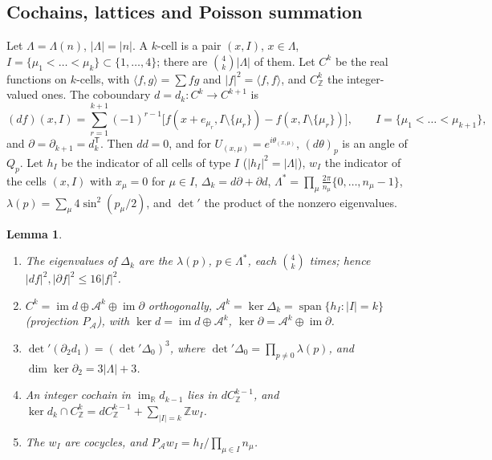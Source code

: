 \documentclass[11pt,a4paper]{amsart}
\newtheorem{lemma}[theorem]{Lemma}
\theoremstyle{definition}
\theoremstyle{remark}
\numberwithin{equation}{section}
\newcommand{\R}{\mathbb{R}}          %
\newcommand{\Z}{\mathbb{Z}}          %
\newcommand{\ip}[2]{\langle #1,#2\rangle}  %
\newcommand{\abs}[1]{\lvert #1\rvert}      %
\begin{document}
\subsection{Cochains, lattices and Poisson summation}

Let $\Lambda=\Lambda(n)$, $|\Lambda|=|n|$. A $k$-cell is a pair $(x,I)$, $x\in\Lambda$, $I=\{\mu_1<\dots<\mu_k\}\subset\{1,\dots,4\}$; there are $\binom4k|\Lambda|$ of them. Let $C^k$ be the real functions on $k$-cells, with $\ip fg=\sum fg$ and $\abs f^2=\ip ff$, and $C^k_\Z$ the integer-valued ones. The coboundary $d=d_k\colon C^k\to C^{k+1}$ is
\begin{equation}\label{eq:villain-d}
(df)(x,I)=\sum_{r=1}^{k+1}(-1)^{r-1}\bigl[f(x+e_{\mu_r},I\setminus\{\mu_r\})-f(x,I\setminus\{\mu_r\})\bigr],\qquad I=\{\mu_1<\dots<\mu_{k+1}\},
\end{equation}
and $\partial=\partial_{k+1}=d_k^{\mathsf T}$. Then $dd=0$, and for $U_{(x,\mu)}=e^{i\theta_{(x,\mu)}}$, $(d\theta)_p$ is an angle of $Q_p$. Let $h_I$ be the indicator of all cells of type $I$ ($\abs{h_I}^2=|\Lambda|$), $w_I$ the indicator of the cells $(x,I)$ with $x_\mu=0$ for $\mu\in I$, $\Delta_k=d\partial+\partial d$, $\Lambda^*=\prod_\mu\frac{2\pi}{n_\mu}\{0,\dots,n_\mu-1\}$, $\lambda(p)=\sum_\mu4\sin^2(p_\mu/2)$, and $\det{}'$ the product of the nonzero eigenvalues.

\begin{lemma}\label{lem:villain-hodge}
\begin{enumerate}[label=(\roman*),leftmargin=2.2em]
\item The eigenvalues of $\Delta_k$ are the $\lambda(p)$, $p\in\Lambda^*$, each $\binom4k$ times; hence $\abs{df}^2,\abs{\partial f}^2\le16\abs f^2$.
\item $C^k=\operatorname{im}d\oplus\mathcal A^k\oplus\operatorname{im}\partial$ orthogonally, $\mathcal A^k=\ker\Delta_k=\operatorname{span}\{h_I:|I|=k\}$ (projection $P_{\mathcal A}$), with $\ker d=\operatorname{im}d\oplus\mathcal A^k$, $\ker\partial=\mathcal A^k\oplus\operatorname{im}\partial$.
\item $\det{}'(\partial_2d_1)=(\det{}'\Delta_0)^3$, where $\det{}'\Delta_0=\prod_{p\ne0}\lambda(p)$, and $\dim\ker\partial_2=3|\Lambda|+3$.
\item An integer cochain in $\operatorname{im}_\R d_{k-1}$ lies in $dC^{k-1}_\Z$, and $\ker d_k\cap C^k_\Z=dC^{k-1}_\Z+\sum_{|I|=k}\Z w_I$.
\item The $w_I$ are cocycles, and $P_{\mathcal A}w_I=h_I/\prod_{\mu\in I}n_\mu$.
\end{enumerate}
\end{lemma}
\end{document}

